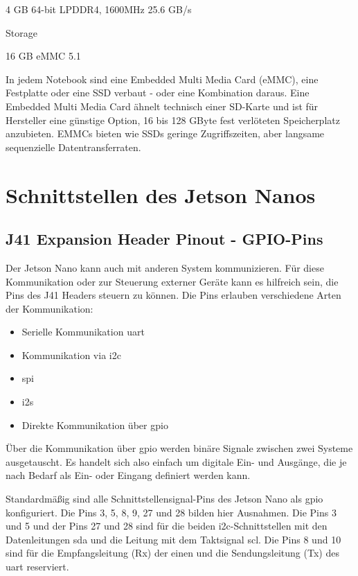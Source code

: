 4 GB 64-bit LPDDR4, 1600MHz 25.6 GB/s 


Storage

16 GB eMMC 5.1 

In jedem Notebook sind eine Embedded Multi Media Card (eMMC), eine Festplatte oder eine SSD verbaut - oder eine Kombination daraus. Eine Embedded Multi Media Card ähnelt technisch einer SD-Karte und ist für Hersteller eine günstige Option, 16 bis 128 GByte fest verlöteten Speicherplatz anzubieten. EMMCs bieten wie SSDs geringe Zugriffszeiten, aber langsame sequenzielle Datentransferraten.



	
	

\section{Schnittstellen des Jetson Nanos}



\subsection{J41 Expansion Header Pinout - GPIO-Pins}

Der Jetson Nano kann auch mit anderen System kommunizieren. Für diese Kommunikation oder zur Steuerung externer Geräte kann es hilfreich sein, die Pins des J41 Headers steuern zu können. Die Pins erlauben verschiedene Arten der Kommunikation:

\begin{itemize}
  \item Serielle Kommunikation \ac{uart}
  \item Kommunikation  via \ac{i2c}
  \item \ac{spi}
  \item \ac{i2s}
  \item Direkte Kommunikation über \ac{gpio}
\end{itemize}    



Über die Kommunikation über \ac{gpio} werden binäre Signale zwischen zwei Systeme ausgetauscht. Es handelt sich also einfach um digitale Ein- und Ausgänge, die je nach Bedarf als Ein- oder Eingang definiert werden kann.

Standardmäßig sind alle Schnittstellensignal-Pins des Jetson Nano als \ac{gpio} konfiguriert. Die Pins 3, 5, 8, 9, 27 und 28 bilden hier Ausnahmen. 
Die Pins 3 und 5 und der Pins 27 und 28 sind für die beiden \ac{i2c}-Schnittstellen mit 
den Datenleitungen \ac{sda}  und die Leitung mit dem Taktsignal \ac{scl}.
Die Pins 8 und 10 sind für die Empfangsleitung (Rx) der einen und die Sendungsleitung (Tx) des \ac{uart} reserviert. \cite{JetsonUserManual:2020} 

